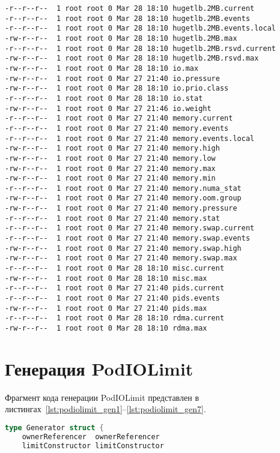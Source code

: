 \begin{appendices}
\begin{lstlisting}[label=lst:cgroup_catalog2, caption={Интерфейсные файлы для контрольной группы (продолжение листинга~\ref{lst:cgroup_catalog1})}]
-r--r--r--  1 root root 0 Mar 28 18:10 hugetlb.2MB.current
-r--r--r--  1 root root 0 Mar 28 18:10 hugetlb.2MB.events
-r--r--r--  1 root root 0 Mar 28 18:10 hugetlb.2MB.events.local
-rw-r--r--  1 root root 0 Mar 28 18:10 hugetlb.2MB.max
-r--r--r--  1 root root 0 Mar 28 18:10 hugetlb.2MB.rsvd.current
-rw-r--r--  1 root root 0 Mar 28 18:10 hugetlb.2MB.rsvd.max
-rw-r--r--  1 root root 0 Mar 28 18:10 io.max
-rw-r--r--  1 root root 0 Mar 27 21:40 io.pressure
-rw-r--r--  1 root root 0 Mar 28 18:10 io.prio.class
-r--r--r--  1 root root 0 Mar 28 18:10 io.stat
-rw-r--r--  1 root root 0 Mar 27 21:46 io.weight
-r--r--r--  1 root root 0 Mar 27 21:40 memory.current
-r--r--r--  1 root root 0 Mar 27 21:40 memory.events
-r--r--r--  1 root root 0 Mar 27 21:40 memory.events.local
-rw-r--r--  1 root root 0 Mar 27 21:40 memory.high
-rw-r--r--  1 root root 0 Mar 27 21:40 memory.low
-rw-r--r--  1 root root 0 Mar 27 21:40 memory.max
-rw-r--r--  1 root root 0 Mar 27 21:40 memory.min
-r--r--r--  1 root root 0 Mar 27 21:40 memory.numa_stat
-rw-r--r--  1 root root 0 Mar 27 21:40 memory.oom.group
-rw-r--r--  1 root root 0 Mar 27 21:40 memory.pressure
-r--r--r--  1 root root 0 Mar 27 21:40 memory.stat
-r--r--r--  1 root root 0 Mar 27 21:40 memory.swap.current
-r--r--r--  1 root root 0 Mar 27 21:40 memory.swap.events
-rw-r--r--  1 root root 0 Mar 27 21:40 memory.swap.high
-rw-r--r--  1 root root 0 Mar 27 21:40 memory.swap.max
-r--r--r--  1 root root 0 Mar 28 18:10 misc.current
-rw-r--r--  1 root root 0 Mar 28 18:10 misc.max
-r--r--r--  1 root root 0 Mar 27 21:40 pids.current
-r--r--r--  1 root root 0 Mar 27 21:40 pids.events
-rw-r--r--  1 root root 0 Mar 27 21:40 pids.max
-r--r--r--  1 root root 0 Mar 28 18:10 rdma.current
-rw-r--r--  1 root root 0 Mar 28 18:10 rdma.max
\end{lstlisting}

\chapter{Генерация PodIOLimit}

Фрагмент кода генерации PodIOLimit представлен в листингах~\ref{lst:podiolimit_gen1}--\ref{lst:podiolimit_gen7}.

\begin{lstlisting}[language=Go,label=lst:podiolimit_gen1, caption={Генерация PodIOLimit}]
type Generator struct {
	ownerReferencer  ownerReferencer
	limitConstructor limitConstructor


\end{lstlisting}
\end{appendices}
